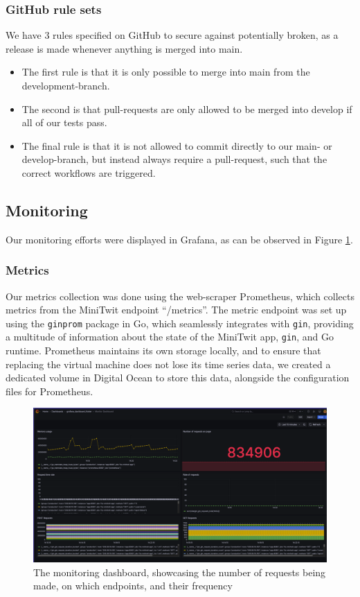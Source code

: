 \subsubsection*{GitHub rule sets}
We have 3 rules specified on GitHub to secure against potentially broken, as a release is made whenever anything is merged into main. 

\begin{itemize}
    \item The first rule is that it is only possible to merge into main from the development-branch.
    \item The second is that pull-requests are only allowed to be merged into develop if all of our tests pass.
    \item The final rule is that it is not allowed to commit directly to our main- or develop-branch, but instead always require a pull-request, such that the correct workflows are triggered.
\end{itemize}
\subsection{Monitoring}
 Our monitoring efforts were displayed in Grafana, as can be observed in Figure \ref{fig:monitor}.
\subsubsection{Metrics}
Our metrics collection was done using the web-scraper Prometheus, which collects metrics from the MiniTwit endpoint “/metrics”. The metric endpoint was set up using the \texttt{ginprom} package in Go, which seamlessly integrates with \texttt{gin}, providing a multitude of information about the state of the MiniTwit app, \texttt{gin}, and Go runtime. Prometheus maintains its own storage locally, and to ensure that replacing the virtual machine does not lose its time series data, we created a dedicated volume in Digital Ocean to store this data, alongside the configuration files for Prometheus. 

\begin{figure} [H]
    \centering
    \includegraphics[width=1\linewidth]{pictures/Monitor.png}
    \caption{The monitoring dashboard, showcasing the number of requests being made, on which endpoints, and their frequency}
    \label{fig:monitor}
\end{figure}

